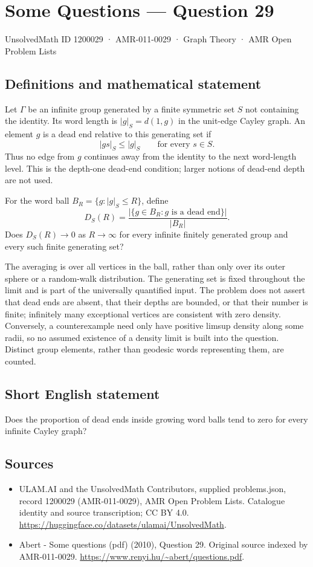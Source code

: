 \documentclass[11pt,a4paper]{article}
\begin{document}
\section*{Some Questions — Question 29}\label{1200029}
{\small UnsolvedMath ID 1200029 · AMR-011-0029 · Graph Theory · AMR Open Problem Lists}
\subsection{Definitions and mathematical statement}
Let $\Gamma$ be an infinite group generated by a finite symmetric set $S$ not containing the identity. Its word length is $|g|_S=d(1,g)$ in the unit-edge Cayley graph. An element $g$ is a dead end relative to this generating set if
\[
 |gs|_S\leq |g|_S\qquad\text{for every }s\in S.
\]
Thus no edge from $g$ continues away from the identity to the next word-length level. This is the depth-one dead-end condition; larger notions of dead-end depth are not used.

For the word ball $B_R=\{g:|g|_S\leq R\}$, define
\[
 D_S(R)=\frac{|\{g\in B_R:g\text{ is a dead end}\}|}{|B_R|}.
\]
Does $D_S(R)\to0$ as $R\to\infty$ for every infinite finitely generated group and every such finite generating set?

The averaging is over all vertices in the ball, rather than only over its outer sphere or a random-walk distribution. The generating set is fixed throughout the limit and is part of the universally quantified input. The problem does not assert that dead ends are absent, that their depths are bounded, or that their number is finite; infinitely many exceptional vertices are consistent with zero density. Conversely, a counterexample need only have positive limsup density along some radii, so no assumed existence of a density limit is built into the question. Distinct group elements, rather than geodesic words representing them, are counted.
\subsection{Short English statement}
Does the proportion of dead ends inside growing word balls tend to zero for every infinite Cayley graph?
\subsection{Sources}
\begin{itemize}
\item[S1] ULAM.AI and the UnsolvedMath Contributors, supplied problems.json, record 1200029 (AMR-011-0029), AMR Open Problem Lists. Catalogue identity and source transcription; CC BY 4.0.
\url{https://huggingface.co/datasets/ulamai/UnsolvedMath}.
\item[S2] Abert - Some questions (pdf) (2010), Question 29. Original source indexed by AMR-011-0029.
\url{https://www.renyi.hu/~abert/questions.pdf}.
\end{itemize}
\end{document}

